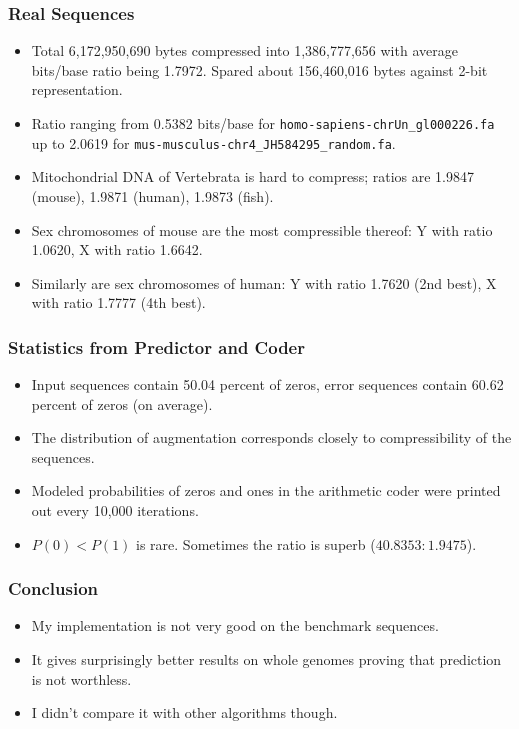 \documentclass[hyperref={colorlinks=true}]{beamer}
\begin{document}
\begin{frame}[fragile]
\frametitle{Real Sequences}

\begin{itemize}
	\item Total 6,172,950,690 bytes compressed into 1,386,777,656 with average bits/base ratio being 1.7972. Spared about 156,460,016 bytes against 2-bit representation.
	\item Ratio ranging from 0.5382 bits/base for \verb|homo-sapiens-chrUn_gl000226.fa| up to 2.0619 for \verb|mus-musculus-chr4_JH584295_random.fa|.
	\item Mitochondrial DNA of Vertebrata is hard to compress; ratios are 1.9847 (mouse), 1.9871 (human), 1.9873 (fish).
	\item Sex chromosomes of mouse are the most compressible thereof: Y with ratio 1.0620, X with ratio 1.6642.
	\item Similarly are sex chromosomes of human: Y with ratio 1.7620 (2nd best), X with ratio 1.7777 (4th best).
\end{itemize}

\end{frame}

\begin{frame}[fragile]
\frametitle{Statistics from Predictor and Coder}

\begin{itemize}
	\item Input sequences contain 50.04 percent of zeros, error sequences contain 60.62 percent of zeros (on average).
	\item The distribution of augmentation corresponds closely to compressibility of the sequences.
	\item Modeled probabilities of zeros and ones in the arithmetic coder were printed out every 10,000 iterations.
	\item $P(0) < P(1)$ is rare. Sometimes the ratio is superb ($40.8353 : 1.9475$).
\end{itemize}

\end{frame}

\begin{frame}
\frametitle{Conclusion}

\begin{itemize}
	\item My implementation is not very good on the benchmark sequences.
	\item It gives surprisingly better results on whole genomes proving that prediction is not worthless.
	\item I didn't compare it with other algorithms though.
\end{itemize}

\end{frame}
\end{document}
